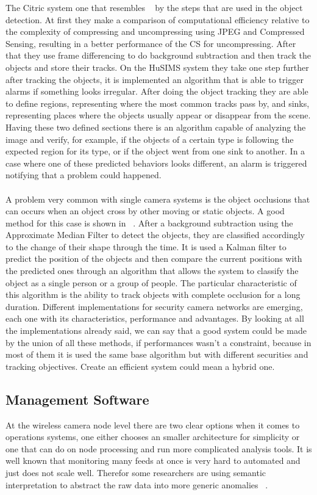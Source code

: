 \documentclass[journal,transmag]{IEEEtran}
\begin{document}
The Citric system one that resembles ~\cite{CS-MoG} by the steps that are used in the object detection. At first they make a comparison of
computational efficiency relative to the complexity of compressing and uncompressing using JPEG and Compressed Sensing, resulting in a better
performance of the CS  for uncompressing. After that they use frame differencing to do background subtraction and then track the objects and store
their tracks. On the HuSIMS system they take one step further after tracking the objects, it is implemented an algorithm that is able to trigger alarms
if something looks irregular. After doing the object tracking they are able to define regions, representing where the most common tracks pass by, and
sinks, representing places where the objects usually appear or disappear from the scene. Having these two defined sections there is an algorithm
capable of analyzing the image and verify, for example, if the objects of a certain type is following the expected region for its type, or if the
object went from one sink to another. In a case where one of these predicted behaviors looks different, an alarm is triggered notifying that a problem
could happened. \\ \\
A problem very common with single camera systems is the object occlusions that can occurs when an object cross by other moving or static objects. A
good method for this case is shown in ~\cite{Occlusion}. After a background subtraction using the Approximate Median Filter to detect the objects, they
are classified accordingly to the change of their shape through the time. It is used a Kalman filter to predict the position of the objects and then 
compare the current positions with the predicted ones through an algorithm that allows the system to classify the object as a single person or a group 
of people. The particular characteristic of this algorithm is the ability to track objects with complete occlusion for a long duration.
Different implementations for security camera networks are emerging, each one with its characteristics, performance and advantages. By looking at all 
the implementations already said, we can say that a good system could be made by the union of all these methods, if performances wasn’t a constraint, 
because in most of them it is used the same base algorithm but with different securities and tracking objectives. Create an efficient system could mean 
a hybrid one.

\subsection{Management Software}
At the wireless camera  node level there are two clear options when it comes to operations systems, one either chooses an smaller architecture for 
simplicity or one that can do on node processing and run more complicated analysis tools.
It is well known that monitoring many feeds at once is very hard to automated and just does not scale well. Therefor some researchers are using semantic
interpretation to abstract the raw data into more generic anomalies ~\cite{HuSIMS}. 
\end{document}
